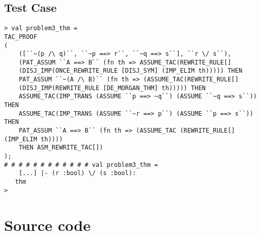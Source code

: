 \documentclass{report}
\begin{document}
\section{Test Case}
\label{trans-10-4-3}
\begin{session}
  \begin{scriptsize}
\begin{verbatim}
> val problem3_thm =
TAC_PROOF
(
	([``~(p /\ q)``, ``~p ==> r``, ``~q ==> s``], ``r \/ s``),
	(PAT_ASSUM ``A ==> B`` (fn th => ASSUME_TAC(REWRITE_RULE[]
	(DISJ_IMP(ONCE_REWRITE_RULE [DISJ_SYM] (IMP_ELIM th))))) THEN
	PAT_ASSUM ``~(A /\ B)`` (fn th => (ASSUME_TAC(REWRITE_RULE[]
	(DISJ_IMP(REWRITE_RULE [DE_MORGAN_THM] th))))) THEN
	ASSUME_TAC(IMP_TRANS (ASSUME ``p ==> ~q``) (ASSUME ``~q ==> s``)) THEN
	ASSUME_TAC(IMP_TRANS (ASSUME ``~r ==> p``) (ASSUME ``p ==> s``)) THEN
	PAT_ASSUM ``A ==> B`` (fn th => (ASSUME_TAC (REWRITE_RULE[] (IMP_ELIM th))))
	THEN ASM_REWRITE_TAC[])
);
# # # # # # # # # # # # val problem3_thm =
    [...] |- (r :bool) \/ (s :bool):
   thm
> 
\end{verbatim}
  \end{scriptsize}
\end{session}

\appendix{}

\chapter{Source code}
\label{cha:source-code}



\end{document}
